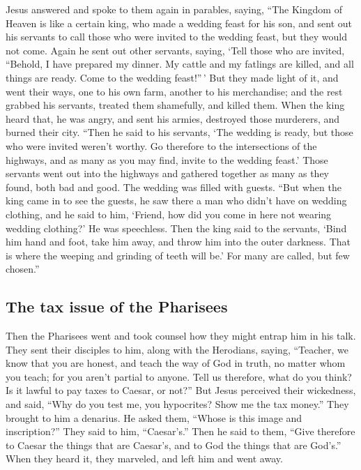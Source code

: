  Jesus answered and spoke to them again in parables,
saying,  ``The Kingdom of Heaven is like a certain king,
who made a wedding feast for his son,  and sent out his
servants to call those who were invited to the wedding feast, but they
would not come.  Again he sent out other servants, saying,
`Tell those who are invited, ``Behold, I have prepared my dinner. My
cattle and my fatlings are killed, and all things are ready. Come to the
wedding feast!''\,'  But they made light of it, and went
their ways, one to his own farm, another to his merchandise;
 and the rest grabbed his servants, treated them
shamefully, and killed them.  When the king heard that, he
was angry, and sent his armies, destroyed those murderers, and burned
their city.  ``Then he said to his servants, `The wedding
is ready, but those who were invited weren't worthy.  Go
therefore to the intersections of the highways, and as many as you may
find, invite to the wedding feast.'  Those servants went
out into the highways and gathered together as many as they found, both
bad and good. The wedding was filled with guests.  ``But
when the king came in to see the guests, he saw there a man who didn't
have on wedding clothing,  and he said to him, `Friend,
how did you come in here not wearing wedding clothing?' He was
speechless.  Then the king said to the servants, `Bind
him hand and foot, take him away, and throw him into the outer darkness.
That is where the weeping and grinding of teeth will be.'
 For many are called, but few chosen.''

\hypertarget{the-tax-issue-of-the-pharisees}{%
\subsection{The tax issue of the
Pharisees}\label{the-tax-issue-of-the-pharisees}}

 Then the Pharisees went and took counsel how they might
entrap him in his talk.  They sent their disciples to
him, along with the Herodians, saying, ``Teacher, we know that you are
honest, and teach the way of God in truth, no matter whom you teach; for
you aren't partial to anyone.  Tell us therefore, what do
you think? Is it lawful to pay taxes to Caesar, or not?''
 But Jesus perceived their wickedness, and said, ``Why do
you test me, you hypocrites?  Show me the tax money.''
They brought to him a denarius.  He asked them, ``Whose
is this image and inscription?''  They said to him,
``Caesar's.'' Then he said to them, ``Give therefore to Caesar the
things that are Caesar's, and to God the things that are God's.''
 When they heard it, they marveled, and left him and went
away.

